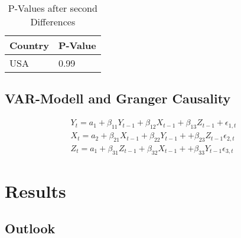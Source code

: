 \documentclass[11pt]{article}
\begin{document}
\begin{table}[h!]
\centering
\caption{P-Values after second Differences}
\label{tab:p-values-second-diff}
\begin{tabular}{|l|l|}
\hline
\textbf{Country} & \textbf{P-Value} \\ \hline
USA              & 0.99             \\ \hline
\end{tabular}
\end{table}

\subsection{VAR-Modell and Granger Causality}

$$
\begin{array}{l}
Y_{t}=a_{1}+\beta_{11} Y_{t-1}+\beta_{12} X_{t-1}+\beta_{13} Z_{t-1}+\epsilon_{1, t} \\
X_{t}=a_{2}+\beta_{21} X_{t-1}+\beta_{22} Y_{t-1}++\beta_{23} Z_{t-1}\epsilon_{2, t}\\
Z_{t}=a_{1}+\beta_{31} Z_{t-1}+\beta_{32} X_{t-1}++\beta_{33} Y_{t-1}\epsilon_{3, t}
\end{array}
$$
\section{Results}
\subsection{Outlook}






\medskip

 
\end{document}
